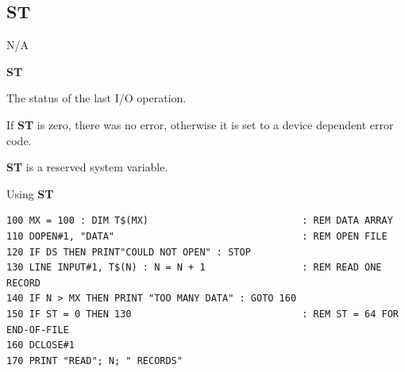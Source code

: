 \subsection{ST}
\begin{description}[leftmargin=2cm,style=nextline]
\item [Token:]    N/A

\item [Format:]   {\bf ST}

\item [Usage:]    The status of the last I/O operation.

                  If {\bf ST} is zero, there was no error, otherwise it is set to a device dependent error code.

\item [Remarks:]  {\bf ST} is a reserved system variable.

\item [Example:]  Using {\bf ST}

\begin{tcolorbox}[colback=black,coltext=white]
\verbatimfont{\codefont}
\begin{verbatim}
100 MX = 100 : DIM T$(MX)                           : REM DATA ARRAY
110 DOPEN#1, "DATA"                                 : REM OPEN FILE
120 IF DS THEN PRINT"COULD NOT OPEN" : STOP
130 LINE INPUT#1, T$(N) : N = N + 1                 : REM READ ONE RECORD
140 IF N > MX THEN PRINT "TOO MANY DATA" : GOTO 160
150 IF ST = 0 THEN 130                              : REM ST = 64 FOR END-OF-FILE
160 DCLOSE#1
170 PRINT "READ"; N; " RECORDS"
\end{verbatim}
\end{tcolorbox}
\end{description}


\newpage
